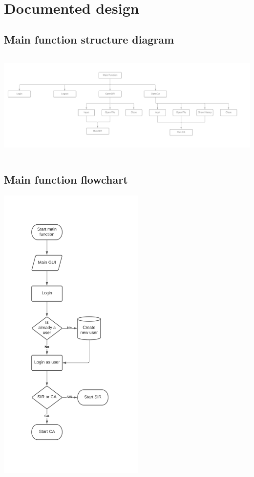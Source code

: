 \documentclass[11pt, a4paper]{article}
\begin{document}
\newpage



\newpage
\section{Documented design}


\subsection{Main function structure diagram}
\includegraphics[height=5.43cm, width=\textwidth]{s_main_function.png}
\subsection{Main function flowchart}
\includegraphics[height=15cm]{f_main.png}
\newpage
\end{document}
